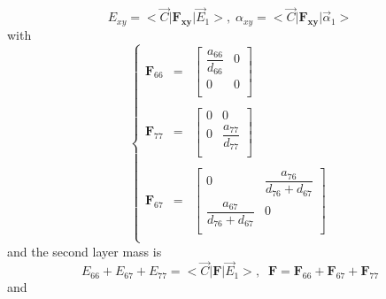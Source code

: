 \documentclass[aps,onecolumn,11pt]{revtex4}
\newcommand{\mymat}[1]{{\bm{#1}}}
\begin{document}
\begin{equation}
\boxed{
E_{xy} = <{\vec{C}} \vert \mymat{F_{xy}} \vert \vec{E}_1 >,\;\alpha_{xy} = <{\vec{C}} \vert \mymat{F_{xy}} \vert \vec{\alpha}_1 >
}
\end{equation}
with
\begin{equation}
\left\lbrace
\begin{array}{rcl}
\mymat{F}_{66} & = & 
\begin{bmatrix}
	\dfrac{a_{66}}{d_{66}} & 0 \\
	0 & 0\\
\end{bmatrix} \\
\\
\mymat{F}_{77} & = & 
\begin{bmatrix}
	0 & 0 \\
	0 & \dfrac{a_{77}}{d_{77}}\\
\end{bmatrix}  \\
\\
\mymat{F}_{67} & = & 
\begin{bmatrix}
	0 &\dfrac{a_{76}}{d_{76}+d_{67}}\\
	\dfrac{a_{67}}{d_{76}+d_{67}} & 0\\
\end{bmatrix} \\
\end{array}
\right.
\end{equation}
and the second layer mass is
\begin{equation}
E_{66} + E_{67} + E_{77} = <{\vec{C}} \vert \mymat{F} \vert \vec{E}_1 >, \;\;
 \mymat{F} 
 =  \mymat{F}_{66} + \mymat{F}_{67}  + \mymat{F}_{77} 
\end{equation}
and
\end{document}
